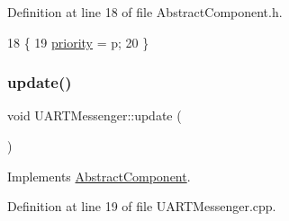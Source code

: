 Definition at line 18 of file Abstract\+Component.\+h.


\begin{DoxyCode}
18                             \{
19         \hyperlink{class_abstract_component_aff57dfa5f31be093a06b55560e33fb95}{priority} = p;
20     \}
\end{DoxyCode}
\mbox{\label{class_u_a_r_t_messenger_a7f2c3bdcf3a2b082e52815b97be37281}} 
\subsubsection{\texorpdfstring{update()}{update()}}
{\footnotesize\ttfamily void U\+A\+R\+T\+Messenger\+::update (\begin{DoxyParamCaption}{ }\end{DoxyParamCaption})\hspace{0.3cm}{\ttfamily [virtual]}}



Implements \hyperlink{class_abstract_component_af25a90b8ab213762221c3b358d9873f3}{Abstract\+Component}.



Definition at line 19 of file U\+A\+R\+T\+Messenger.\+cpp.


